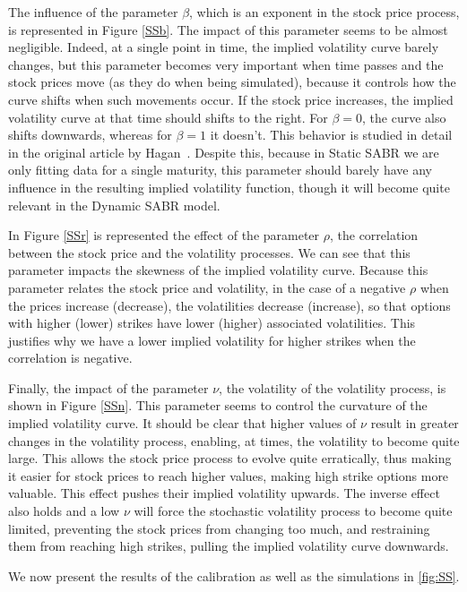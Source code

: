 The influence of the parameter $\beta$, which is an exponent in the stock price process, is represented in Figure \autoref{SSb}. The impact of this parameter seems to be almost negligible. Indeed, at a single point in time, the implied volatility curve barely changes, but this parameter becomes very important when time passes and the stock prices move (as they do when being simulated), because it controls how the curve shifts when such movements occur. If the stock price increases, the implied volatility curve at that time should shifts to the right. For $\beta=0$, the curve also shifts downwards, whereas for $\beta=1$ it doesn't. This behavior is studied in detail in the original article by Hagan~\citep{Hagan}.
Despite this, because in Static SABR we are only fitting data for a single maturity, this parameter should barely have any influence in the resulting implied volatility function, though it will become quite relevant in the Dynamic SABR model.

In Figure \autoref{SSr} is represented the effect of the parameter $\rho$, the correlation between the stock price and the volatility processes.
We can see that this parameter impacts the skewness of the implied volatility curve. Because this parameter relates the stock price and volatility, in the case of a negative $\rho$ when the prices increase (decrease), the volatilities decrease (increase), so that options with higher (lower) strikes have lower (higher) associated volatilities. This justifies why we have a lower implied volatility for higher strikes when the correlation is negative.

Finally, the impact of the parameter $\nu$, the volatility of the volatility process, is shown in Figure \autoref{SSn}. This parameter seems to control the curvature of the implied volatility curve. It should be clear that higher values of $\nu$ result in greater changes in the volatility process, enabling, at times, the volatility to become quite large. This allows the stock price process to evolve quite erratically, thus making it easier for stock prices to reach higher values, making high strike options more valuable. This effect pushes their implied volatility upwards. The inverse effect also holds and a low $\nu$ will force the stochastic volatility process to become quite limited, preventing the stock prices from changing too much, and restraining them from reaching high strikes, pulling the implied volatility curve downwards.


We now present the results of the calibration as well as the simulations in \autoref{fig:SS}.

